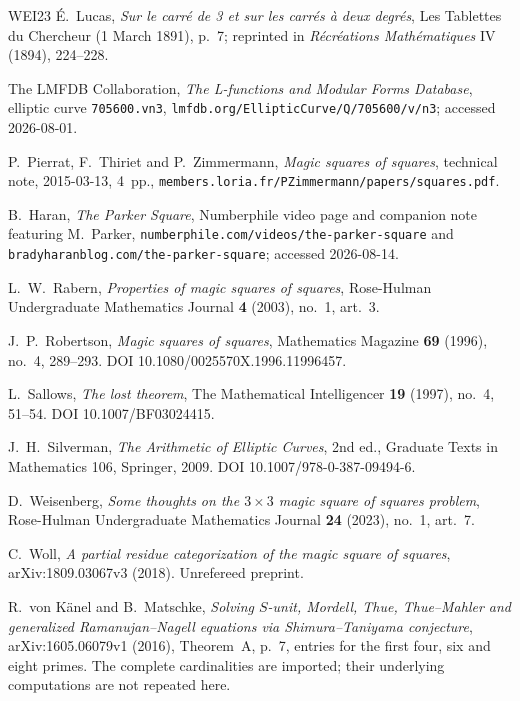 \begin{thebibliography}{WEI23}
 \'E.~Lucas, \emph{Sur le carr\'e de 3 et sur les
carr\'es \`a deux degr\'es}, Les Tablettes du Chercheur (1 March 1891),
p.~7; reprinted in \emph{R\'ecr\'eations Math\'ematiques} IV (1894),
224--228.

 The LMFDB Collaboration, \emph{The L-functions and
Modular Forms Database}, elliptic curve \texttt{705600.vn3},
\texttt{lmfdb.org/EllipticCurve/Q/705600/v/n3}; accessed 2026-08-01.

 P.~Pierrat, F.~Thiriet and P.~Zimmermann,
\emph{Magic squares of squares}, technical note, 2015-03-13, 4~pp.,
\texttt{members.loria.fr/PZimmermann/papers/squares.pdf}.

 B.~Haran, \emph{The Parker Square}, Numberphile video
page and companion note featuring M.~Parker,
\texttt{numberphile.com/videos/the-parker-square} and
\texttt{bradyharanblog.com/the-parker-square}; accessed 2026-08-14.

 L.~W.~Rabern, \emph{Properties of magic squares of
squares}, Rose-Hulman Undergraduate Mathematics Journal \textbf{4} (2003),
no.~1, art.~3.

 J.~P.~Robertson, \emph{Magic squares of squares},
Mathematics Magazine \textbf{69} (1996), no.~4, 289--293.
DOI 10.1080/0025570X.1996.11996457.

 L.~Sallows, \emph{The lost theorem}, The
Mathematical Intelligencer \textbf{19} (1997), no.~4, 51--54.
DOI 10.1007/BF03024415.

 J.~H.~Silverman, \emph{The Arithmetic of Elliptic
Curves}, 2nd ed., Graduate Texts in Mathematics 106, Springer, 2009.
DOI 10.1007/978-0-387-09494-6.

 D.~Weisenberg, \emph{Some thoughts on the
$3\times3$ magic square of squares problem}, Rose-Hulman Undergraduate
Mathematics Journal \textbf{24} (2023), no.~1, art.~7.

 C.~Woll, \emph{A partial residue categorization of
the magic square of squares}, arXiv:1809.03067v3 (2018). Unrefereed
preprint.

 R.~von K\"anel and B.~Matschke, \emph{Solving
$S$-unit, Mordell, Thue, Thue--Mahler and generalized Ramanujan--Nagell
equations via Shimura--Taniyama conjecture}, arXiv:1605.06079v1 (2016),
Theorem~A, p.~7, entries for the first four, six and eight primes.
The complete cardinalities are imported; their underlying computations
are not repeated here.

\end{thebibliography}
\endgroup
